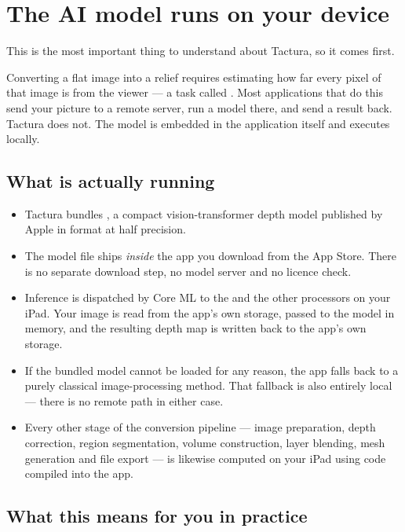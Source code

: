 \documentclass[11pt]{article}
\begin{document}
\section{The AI model runs on your device}

This is the most important thing to understand about Tactura, so it comes first.

Converting a flat image into a relief requires estimating how far every pixel of that
image is from the viewer — a task called . Most
applications that do this send your picture to a remote server, run a model there, and
send a result back. Tactura does not. The model is embedded in the application itself
and executes locally.

\subsection{What is actually running}

\begin{itemize}
  \item Tactura bundles , a compact
        vision-transformer depth model published by Apple in 
        format at half precision.
  \item The model file ships \emph{inside} the app you download from the App Store.
        There is no separate download step, no model server and no licence check.
  \item Inference is dispatched by Core ML to the  and the
        other processors on your iPad. Your image is read from the app's own storage,
        passed to the model in memory, and the resulting depth map is written back to
        the app's own storage.
  \item If the bundled model cannot be loaded for any reason, the app falls back to a
        purely classical image-processing method. That fallback is also entirely local
        — there is no remote path in either case.
  \item Every other stage of the conversion pipeline — image preparation, depth
        correction, region segmentation, volume construction, layer blending, mesh
        generation and file export — is likewise computed on your iPad using code
        compiled into the app.
\end{itemize}

\subsection{What this means for you in practice}
\end{document}
